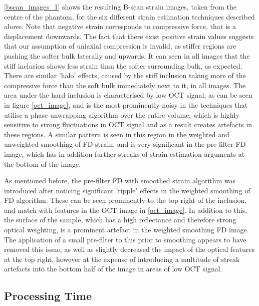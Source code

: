 \autoref{bscan_images_1} shows the resulting B-scan strain images, taken from the centre of the phantom, for the six different strain estimation techniques described above. Note that negative strain corresponds to compressive force, that is a displacement downwards. The fact that there exist positive strain values suggests that our assumption of uniaxial compression is invalid, as stiffer regions are pushing the softer bulk laterally and upwards. It can seen in all images that the stiff inclusion shows less strain than the softer surrounding bulk, as expected. There are similar 'halo' effects, caused by the stiff inclusion taking more of the compressive force than the soft bulk immediately next to it, in all images. The area under the hard inclusion is characterised by low OCT signal, as can be seen in figure \autoref{oct_image}, and is the most prominently noisy in the techniques that utilise a phase unwrapping algorithm over the entire volume, which is highly sensitive to strong fluctuations in OCT signal and as a result creates artefacts in these regions. A similar pattern is seen in this region in the weighted and unweighted smoothing of FD strain, and is very significant in the pre-filter FD image, which has in addition further streaks of strain estimation arguments at the bottom of the image. 

As mentioned before, the pre-filter FD with smoothed strain algorithm was introduced after noticing significant 'ripple' effects in the weighted smoothing of FD algorithm. These can be seen prominently to the top right of the inclusion, and match with features in the OCT image in \autoref{oct_image}. In addition to this, the surface of the sample, which has a high reflectance and therefore strong optical weighting, is a  prominent artefact in the weighted smoothing FD image. The application of a small pre-filter to this prior to smoothing appears to have removed this issue, as well as slightly decreased the impact of the optical features at the top right, however at the expense of introducing a multitude of streak artefacts into the bottom half of the image in areas of low OCT signal.

\subsection{Processing Time}

